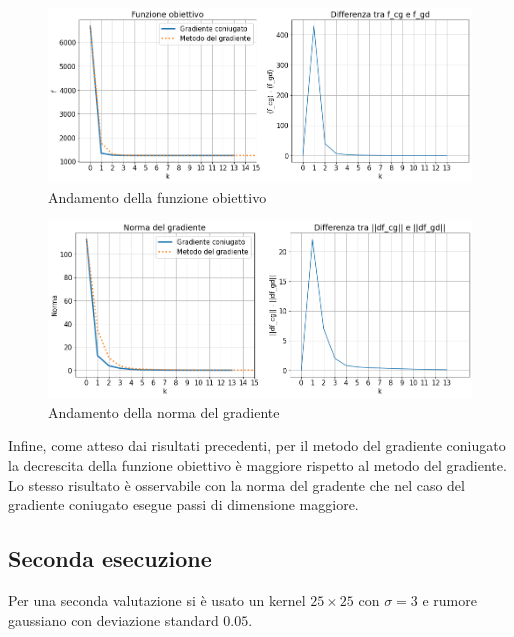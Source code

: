 \documentclass[11pt]{article}
\begin{document}
\begin{figure}[H]
    \centering
    \includegraphics[width=12cm]{iterazioni_cg_gd/1/funzione_obiettivo.png}
    \caption{Andamento della funzione obiettivo}
    \label{fig:obiettivo1}
\end{figure}
\begin{figure}[H]
    \centering
    \includegraphics[width=12cm]{iterazioni_cg_gd/1/norma_gradiente.png}
    \caption{Andamento della norma del gradiente}
    \label{fig:gradiente1}
\end{figure}
Infine, come atteso dai risultati precedenti, per il metodo del gradiente coniugato la decrescita della funzione obiettivo è maggiore rispetto al metodo del gradiente. 
Lo stesso risultato è osservabile con la norma del gradente che nel caso del gradiente coniugato esegue passi di dimensione maggiore.

\subsection{Seconda esecuzione}
Per una seconda valutazione si è usato un kernel $25 \times 25$ con $\sigma=3$ e rumore gaussiano con deviazione standard $0.05$.\\
\end{document}

